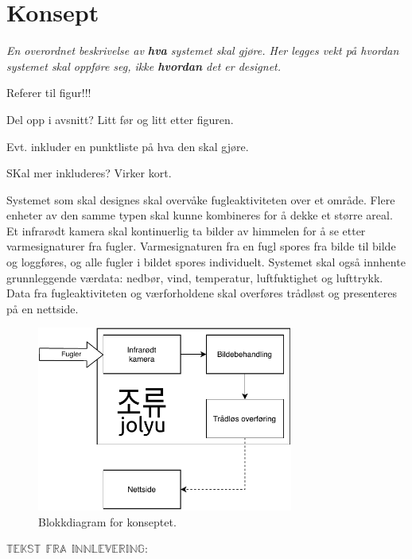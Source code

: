 \section{Konsept}
\label{sec:konsept}
\textit{En overordnet beskrivelse av \textbf{hva} systemet skal gjøre. Her legges vekt på hvordan systemet skal oppføre seg, ikke \textbf{hvordan} det er designet.}

Referer til figur!!!

Del opp i avsnitt? Litt før og litt etter figuren. 

Evt. inkluder en punktliste på hva den skal gjøre.

SKal mer inkluderes? Virker kort.

Systemet som skal designes skal overvåke fugleaktiviteten over et område. Flere enheter av den samme typen skal kunne kombineres for å dekke et større areal. Et infrarødt kamera skal kontinuerlig ta bilder av himmelen for å se etter varmesignaturer fra fugler. Varmesignaturen fra en fugl spores fra bilde til bilde og loggføres, og alle fugler i bildet spores individuelt. Systemet skal også innhente grunnleggende værdata: nedbør, vind, temperatur, luftfuktighet og lufttrykk. Data fra fugleaktiviteten og værforholdene skal overføres trådløst og presenteres på en nettside.

\begin{figure}[H]
    \centering
    \includegraphics[width=0.75\textwidth]{konsept/Diagram_konsept.pdf}
    \caption{Blokkdiagram for konseptet.}
    \label{fig:konsept}
\end{figure}
 

$\mathbb{TEKST} \:\: \mathbb{FRA} \:\: \mathbb{INNLEVERING}$:

